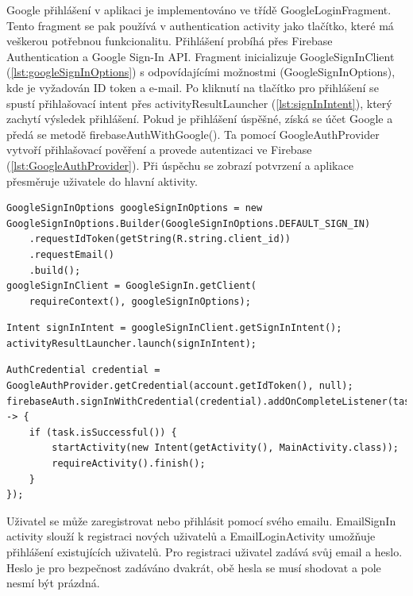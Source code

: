 \newpage

Google přihlášení v aplikaci je implementováno ve třídě GoogleLoginFragment. Tento fragment se pak používá v authentication activity jako tlačítko, které má veškerou potřebnou funkcionalitu.  Přihlášení probíhá přes Firebase Authentication a Google Sign-In API. Fragment inicializuje GoogleSignInClient (\autoref{lst:googleSignInOptions}) s odpovídajícími možnostmi (GoogleSignInOptions), kde je vyžadován ID token a e-mail. Po kliknutí na tlačítko pro přihlášení se spustí přihlašovací intent přes activityResultLauncher (\autoref{lst:signInIntent}), který zachytí výsledek přihlášení. Pokud je přihlášení úspěšné, získá se účet Google a předá se metodě firebaseAuthWithGoogle(). Ta pomocí GoogleAuthProvider vytvoří přihlašovací pověření a provede autentizaci ve Firebase (\autoref{lst:GoogleAuthProvider}). Při úspěchu se zobrazí potvrzení a aplikace přesměruje uživatele do hlavní aktivity.

\begin{lstlisting}[style=javastyle,caption = {googleSignInOptions},label = {lst:googleSignInOptions}]
GoogleSignInOptions googleSignInOptions = new GoogleSignInOptions.Builder(GoogleSignInOptions.DEFAULT_SIGN_IN)
    .requestIdToken(getString(R.string.client_id))
    .requestEmail()
    .build();
googleSignInClient = GoogleSignIn.getClient(
    requireContext(), googleSignInOptions);
\end{lstlisting}        

\begin{lstlisting}[style=javastyle,caption = {signInIntent},label = {lst:signInIntent}]
Intent signInIntent = googleSignInClient.getSignInIntent();
activityResultLauncher.launch(signInIntent);
\end{lstlisting}          

\begin{lstlisting}[style=javastyle,caption = {GoogleAuthProvider},label = {lst:GoogleAuthProvider}]
AuthCredential credential = GoogleAuthProvider.getCredential(account.getIdToken(), null);
firebaseAuth.signInWithCredential(credential).addOnCompleteListener(task -> {
    if (task.isSuccessful()) {
        startActivity(new Intent(getActivity(), MainActivity.class));
        requireActivity().finish();
    }
});
\end{lstlisting} 

\newpage

Uživatel se může zaregistrovat nebo přihlásit pomocí svého emailu. EmailSignIn activity  slouží k registraci nových uživatelů a EmailLoginActivity  umožňuje přihlášení existujících uživatelů. Pro registraci uživatel zadává svůj email a heslo. Heslo je pro bezpečnost zadáváno dvakrát, obě hesla se musí shodovat a pole nesmí být prázdná.


